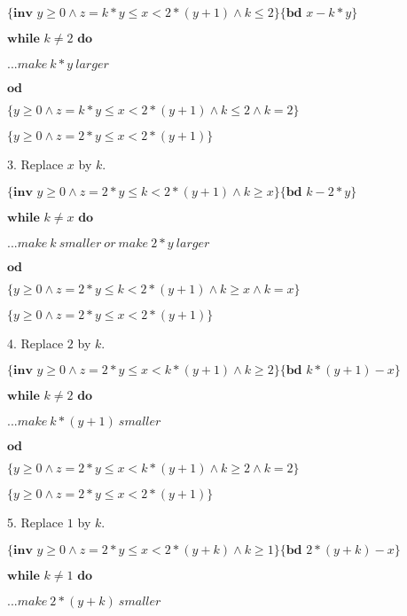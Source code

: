 \documentclass{article}
\begin{document}
$\{\textbf{inv } y \geq 0 \wedge z=k*y \leq x < 2*(y+1) \wedge k \leq 2\} \{\textbf{bd } x-k*y\}$

$\textbf{while } k \neq 2 \textbf{ do}$

\qquad \qquad $...make\ k*y\ larger$

$\textbf{od}$

$\{y \geq 0 \wedge z=k*y \leq x < 2*(y+1) \wedge k \leq 2 \wedge k=2\}$

$\{y \geq 0 \wedge z=2*y \leq x < 2*(y+1)\}$

\vspace{10pt}

3. Replace $x$ by $k$.
\vspace{10pt}

$\{\textbf{inv } y \geq 0 \wedge z=2*y \leq k < 2*(y+1) \wedge k \geq x\} \{\textbf{bd } k-2*y\}$

$\textbf{while } k \neq x \textbf{ do}$

\qquad \qquad $...make\ k\ smaller\ or\ make\ 2*y\ larger$

$\textbf{od}$

$\{y \geq 0 \wedge z=2*y \leq k < 2*(y+1) \wedge k \geq x \wedge k=x\}$

$\{y \geq 0 \wedge z=2*y \leq x < 2*(y+1)\}$

\vspace{10pt}

4. Replace $2$ by $k$.
\vspace{10pt}

$\{\textbf{inv } y \geq 0 \wedge z=2*y \leq x < k*(y+1) \wedge k \geq 2\} \{\textbf{bd } k*(y+1)-x\}$

$\textbf{while } k \neq 2 \textbf{ do}$

\qquad \qquad $...make\ k*(y+1)\ smaller$

$\textbf{od}$

$\{y \geq 0 \wedge z=2*y \leq x < k*(y+1) \wedge k \geq 2 \wedge k=2\}$

$\{y \geq 0 \wedge z=2*y \leq x < 2*(y+1)\}$

\vspace{10pt}

5. Replace $1$ by $k$.
\vspace{10pt}

$\{\textbf{inv } y \geq 0 \wedge z=2*y \leq x < 2*(y+k) \wedge k \geq 1\} \{\textbf{bd } 2*(y+k)-x\}$

$\textbf{while } k \neq 1 \textbf{ do}$

\qquad \qquad $...make\ 2*(y+k)\ smaller$
\end{document}
